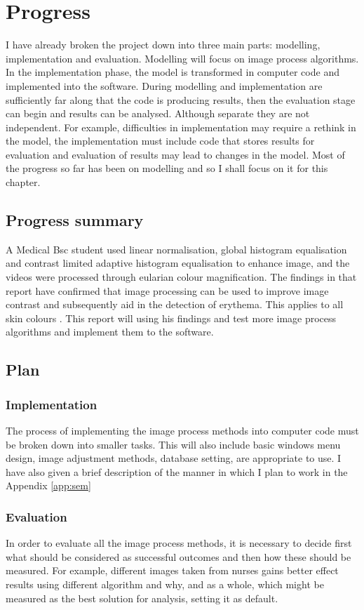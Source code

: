 \chapter{Progress} 

I have already broken the project down into three main parts: modelling, implementation and evaluation. Modelling will focus on image process algorithms. In the implementation phase, the model is transformed in computer code and implemented into the software. During modelling and implementation are sufficiently far along that the code is producing results, then the evaluation stage can begin and results can be
analysed. Although separate they are not independent. For example, difficulties in implementation may require a rethink in the model, the implementation must include code that stores results for evaluation and evaluation of results may lead to changes in the model. Most of the progress so far has been on modelling and so I shall focus on it for this chapter.


\section{Progress summary} \label{prog:model}
A Medical Bsc student used linear normalisation, global histogram equalisation and contrast limited adaptive histogram equalisation to enhance image, and the videos were processed through eularian colour magnification. The findings in that report have confirmed that image processing can be used to improve image contrast and subsequently aid in the detection of erythema. This applies to all skin colours \cite{Mohammed}.
This report will using his findings and test more image process algorithms and implement them to the software.

\section{Plan}



\subsection{Implementation}
The process of implementing the image process methods into computer code must be broken down into smaller tasks. This will also include basic windows menu design, image adjustment methods, database setting, are appropriate to use. I have also given a brief description of the manner in which I plan to work in the Appendix \ref{app:sem}

\subsection{Evaluation}
In order to evaluate all the image process methods, it is necessary to decide
first what should be considered as successful outcomes and then how
these should be measured. For example, different images taken from nurses gains better effect results using different algorithm and why, and as a whole, which might be
measured as the best solution for analysis, setting it as default.
